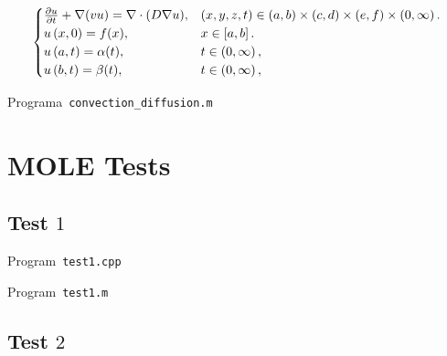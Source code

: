 \begin{equation}\label{eq:IBVP3d}
    \begin{cases}
        \diffp{u}{t} + \nabla(v u) = \nabla \cdot (D \nabla u),
                                      & \left(x,y,z,t\right)\in
        \left(a,b \right)\times\left(c,d \right)\times \left(e,f \right)\times\left(0, \infty \right).     \\
        u\left(x,0\right)=f(x),
                                      & x\in
        \left[a,b\right].                                   \\
        u\left(a,t\right)= \alpha(t), & t\in
        \left(0,\infty\right),                              \\
        u\left(b,t\right)= \beta(t),
                                      & t\in
        \left(0,\infty\right),
    \end{cases}
\end{equation}


\begin{listing}[ht!]
    \tiny
    \centering
    \caption{Programa~\texttt{convection\_diffusion.m}}
    \label{code:convection_diffusion.m}
\end{listing}

\chapter{MOLE Tests}

\section{Test $1$}

\begin{listing}[ht!]
	\tiny
	\centering
	\caption{Program~\texttt{test1.cpp}}
	\label{code:test1.cpp}
\end{listing}

\begin{listing}[ht!]
	\tiny
	\centering
	\caption{Program~\texttt{test1.m}}
	\label{code:test1.m}
\end{listing}

\section{Test $2$}

